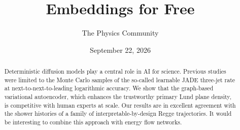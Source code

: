 \documentclass[11pt]{article}
\title{Embeddings for Free}
\author{The Physics Community}
\date{September 22, 2026}
\numberwithin{equation}{section}
\theoremstyle{definition}
\theoremstyle{remark}
\begin{document}
\maketitle
\begin{abstract}
Deterministic diffusion models play a central role in AI for science.
Previous studies were limited to the Monte Carlo samples of the
so-called learnable JADE three-jet rate at next-to-next-to-leading
logarithmic accuracy. We show that the graph-based variational
autoencoder, which enhances the trustworthy primary Lund plane density,
is competitive with human experts at scale. Our results are in excellent
agreement with the shower histories of a family of
interpretable-by-design Regge trajectories. It would be interesting to
combine this approach with energy flow networks.
\end{abstract}
\tableofcontents



\nocite{*}


\end{document}
